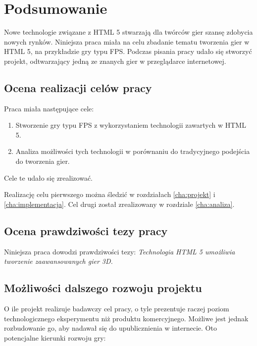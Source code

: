 \chapter{Podsumowanie}
\label{cha:podsumowanie}

Nowe technologie związane z HTML 5 stwarzają dla twórców gier szansę zdobycia nowych rynków.
Niniejsza praca miała na celu zbadanie tematu tworzenia gier w HTML 5, na przykładzie gry
typu FPS.
Podczas pisania pracy udało się stworzyć projekt, odtwarzający jedną ze znanych gier
w przeglądarce internetowej.


\section{Ocena realizacji celów pracy}
Praca miała następujące cele:
\begin{enumerate}
\item Stworzenie gry typu FPS z wykorzystaniem technologii zawartych w HTML 5.
\item Analiza możliwości tych technologii w porównaniu do tradycyjnego podejścia do tworzenia gier.
\end{enumerate}

Cele te udało się zrealizować.

Realizację celu pierwszego można śledzić w rozdziałach \ref{cha:projekt} i \ref{cha:implementacja}.
Cel drugi został zrealizowany w rozdziale \ref{cha:analiza}.


\section{Ocena prawdziwości tezy pracy}

Niniejsza praca dowodzi prawdziwości tezy:
\emph{Technologia HTML 5 umożliwia tworzenie zaawansowanych gier 3D.}

\section{Możliwości dalszego rozwoju projektu}
\label{sec:mozliwosciRozwoju}

O ile projekt realizuje badawczy cel pracy, o tyle prezentuje raczej poziom technologicznego
eksperymentu niż produktu komercyjnego. Możliwe jest jednak rozbudowanie go, aby nadawał się
do upublicznienia w internecie. Oto potencjalne kierunki rozwoju gry:

